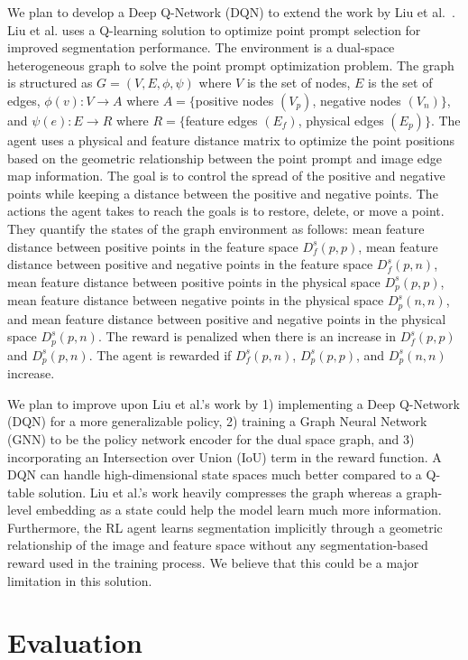 \documentclass[conference]{IEEEtran}
\begin{document}
We plan to develop a Deep Q-Network (DQN) to extend the work by Liu et al.~\cite{Liu2025PPO}. Liu et al. uses a Q-learning solution to optimize point prompt selection for improved segmentation performance. The environment is a dual-space heterogeneous graph to solve the point prompt optimization problem. The graph is structured as $G = (V, E, \phi, \psi)$ where $V$ is the set of nodes, $E$ is the set of edges, $\phi(v): V \rightarrow A$ where $A = \{$positive nodes $(V_p)$, negative nodes $(V_n)\}$, and $\psi(e): E \rightarrow R$ where $R = \{$feature edges $(E_f)$, physical edges $(E_p)\}$. The agent uses a physical and feature distance matrix to optimize the point positions based on the geometric relationship between the point prompt and image edge map information. The goal is to control the spread of the positive and negative points while keeping a distance between the positive and negative points. The actions the agent takes to reach the goals is to restore, delete, or move a point. They quantify the states of the graph environment as follows: mean feature distance between positive points in the feature space $D_f^s(p,p)$, mean feature distance between positive and negative points in the feature space $D_f^s(p,n)$, mean feature distance between positive points in the physical space $D_p^s(p,p)$, mean feature distance between negative points in the physical space $D_p^s(n,n)$, and mean feature distance between positive and negative points in the physical space $D_p^s(p,n)$. The reward is penalized when there is an increase in $D_f^s(p,p)$ and $D_p^s(p,n)$. The agent is rewarded if $D_f^s(p,n)$, $D_p^s(p,p)$, and $D_p^s(n,n)$ increase.

We plan to improve upon Liu et al.'s work by 1) implementing a Deep Q-Network (DQN) for a more generalizable policy, 2) training a Graph Neural Network (GNN) to be the policy network encoder for the dual space graph, and 3) incorporating an Intersection over Union (IoU) term in the reward function. A DQN can handle high-dimensional state spaces much better compared to a Q-table solution. Liu et al.'s work heavily compresses the graph whereas a graph-level embedding as a state could help the model learn much more information. Furthermore, the RL agent learns segmentation implicitly through a geometric relationship of the image and feature space without any segmentation-based reward used in the training process. We believe that this could be a major limitation in this solution.

\section{Evaluation}
\end{document}
